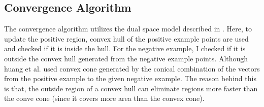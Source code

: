 \subsection{Convergence Algorithm}
The convergence algorithm utilizes the dual space model described in \cite{huang2018optimization}. Here, to update the positive region, convex hull of the
positive example points are used and checked if it is inside the hull. For the negative example, I checked if it is outside the convex hull generated from
the negative example points. Although huang et al. used convex cone generated by the conical combination of the vectors from the positive example to the
given negative example. The reason behind this is that, the outside region of a convex hull can eliminate regions more faster than the conve cone (since it
covers more area than the convex cone).